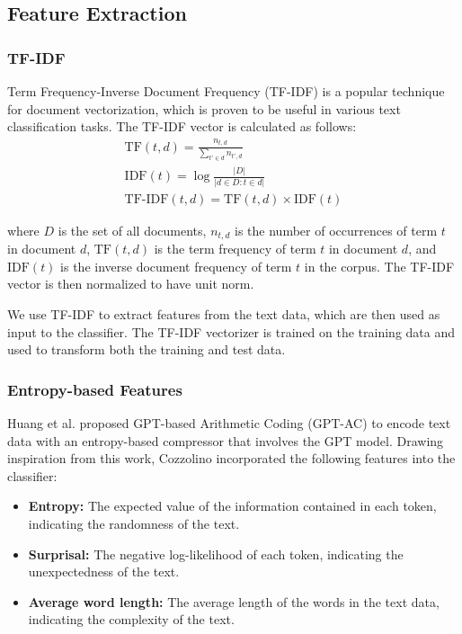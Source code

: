 \documentclass[conference]{IEEEtran}
\begin{document}
\subsection{Feature Extraction}

\subsubsection{TF-IDF}

Term Frequency-Inverse Document Frequency (TF-IDF) is a popular technique for document vectorization, which is proven to be useful in various text classification tasks. The TF-IDF vector is calculated as follows:
\begin{gather}
  \text{TF}(t, d) = \frac{n_{t, d}}{\sum_{t' \in d} n_{t', d}} \\
  \text{IDF}(t) = \log \frac{|D|}{|{d \in D : t \in d}|} \\
  \text{TF-IDF}(t, d) = \text{TF}(t, d) \times \text{IDF}(t)
\end{gather}

where $D$ is the set of all documents, $n_{t, d}$ is the number of occurrences of term $t$ in document $d$, $\text{TF}(t, d)$ is the term frequency of term $t$ in document $d$, and $\text{IDF}(t)$ is the inverse document frequency of term $t$ in the corpus. The TF-IDF vector is then normalized to have unit norm.

We use TF-IDF to extract features from the text data, which are then used as input to the classifier. The TF-IDF vectorizer is trained on the training data and used to transform both the training and test data.

\subsubsection{Entropy-based Features}

Huang et al. \cite{huang2023gpt} proposed GPT-based Arithmetic Coding (GPT-AC) to encode text data with an entropy-based compressor that involves the GPT model. Drawing inspiration from this work, Cozzolino \cite{6thplace} incorporated the following features into the classifier:
\begin{itemize}
  \item \textbf{Entropy:} The expected value of the information contained in each token, indicating the randomness of the text.
  \item \textbf{Surprisal:} The negative log-likelihood of each token, indicating the unexpectedness of the text.
  \item \textbf{Average word length:} The average length of the words in the text data, indicating the complexity of the text.
\end{itemize}
\end{document}
